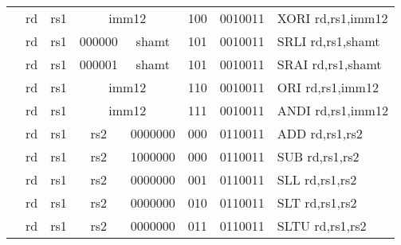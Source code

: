 \begin{table}[p]
\begin{small}
\begin{center}
\begin{tabular}{rccccccccccl}
&
\multicolumn{1}{|c|}{rd} &
\multicolumn{1}{c|}{rs1} &
\multicolumn{5}{c|}{imm12} &
\multicolumn{2}{c|}{100} &
\multicolumn{1}{c|}{0010011} & XORI rd,rs1,imm12 \\
\cline{2-11}
  

&
\multicolumn{1}{|c|}{rd} &
\multicolumn{1}{c|}{rs1} &
\multicolumn{2}{c|}{000000} &
\multicolumn{3}{c|}{shamt} &
\multicolumn{2}{c|}{101} &
\multicolumn{1}{c|}{0010011} & SRLI rd,rs1,shamt \\
\cline{2-11}
  

&
\multicolumn{1}{|c|}{rd} &
\multicolumn{1}{c|}{rs1} &
\multicolumn{2}{c|}{000001} &
\multicolumn{3}{c|}{shamt} &
\multicolumn{2}{c|}{101} &
\multicolumn{1}{c|}{0010011} & SRAI rd,rs1,shamt \\
\cline{2-11}
  

&
\multicolumn{1}{|c|}{rd} &
\multicolumn{1}{c|}{rs1} &
\multicolumn{5}{c|}{imm12} &
\multicolumn{2}{c|}{110} &
\multicolumn{1}{c|}{0010011} & ORI rd,rs1,imm12 \\
\cline{2-11}
  

&
\multicolumn{1}{|c|}{rd} &
\multicolumn{1}{c|}{rs1} &
\multicolumn{5}{c|}{imm12} &
\multicolumn{2}{c|}{111} &
\multicolumn{1}{c|}{0010011} & ANDI rd,rs1,imm12 \\
\cline{2-11}
  

&
\multicolumn{1}{|c|}{rd} &
\multicolumn{1}{c|}{rs1} &
\multicolumn{1}{c|}{rs2} &
\multicolumn{4}{c|}{0000000} &
\multicolumn{2}{c|}{000} &
\multicolumn{1}{c|}{0110011} & ADD rd,rs1,rs2 \\
\cline{2-11}
  

&
\multicolumn{1}{|c|}{rd} &
\multicolumn{1}{c|}{rs1} &
\multicolumn{1}{c|}{rs2} &
\multicolumn{4}{c|}{1000000} &
\multicolumn{2}{c|}{000} &
\multicolumn{1}{c|}{0110011} & SUB rd,rs1,rs2 \\
\cline{2-11}
  

&
\multicolumn{1}{|c|}{rd} &
\multicolumn{1}{c|}{rs1} &
\multicolumn{1}{c|}{rs2} &
\multicolumn{4}{c|}{0000000} &
\multicolumn{2}{c|}{001} &
\multicolumn{1}{c|}{0110011} & SLL rd,rs1,rs2 \\
\cline{2-11}
  

&
\multicolumn{1}{|c|}{rd} &
\multicolumn{1}{c|}{rs1} &
\multicolumn{1}{c|}{rs2} &
\multicolumn{4}{c|}{0000000} &
\multicolumn{2}{c|}{010} &
\multicolumn{1}{c|}{0110011} & SLT rd,rs1,rs2 \\
\cline{2-11}
  

&
\multicolumn{1}{|c|}{rd} &
\multicolumn{1}{c|}{rs1} &
\multicolumn{1}{c|}{rs2} &
\multicolumn{4}{c|}{0000000} &
\multicolumn{2}{c|}{011} &
\multicolumn{1}{c|}{0110011} & SLTU rd,rs1,rs2 \\
\cline{2-11}
  


\end{tabular}
\end{center}
\end{small}
\end{table}
